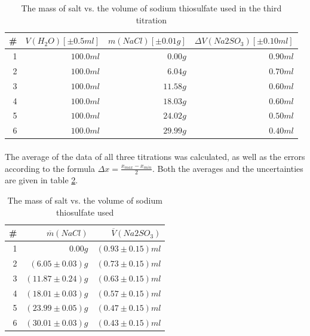 \documentclass[a4paper]{article}
\begin{document}
\begin{table}[ht]
  \center
  \begin{tabular}{ r | r | r | r }
    \# & $V(H_2O) \left[ \pm 0.5 \si{ml} \right]$ & $m(NaCl) \left[ \pm 0.01
      \si{g} \right]$ & $\Delta V(Na2SO_3) \left[ \pm 0.10 \si{ml} \right]$ \\
      \hline \hline
    1 & $100.0 \si{ml}$ & $0.00 \si{g}$ & $0.90 \si{ml}$ \\ \hline
    2 & $100.0 \si{ml}$ & $6.04 \si{g}$ & $0.70 \si{ml}$ \\ \hline
    3 & $100.0 \si{ml}$ & $11.58 \si{g}$ & $0.60 \si{ml}$ \\ \hline
    4 & $100.0 \si{ml}$ & $18.03 \si{g}$ & $0.60 \si{ml}$ \\ \hline
    5 & $100.0 \si{ml}$ & $24.02 \si{g}$ & $0.50 \si{ml}$ \\ \hline
    6 & $100.0 \si{ml}$ & $29.99 \si{g}$ & $0.40 \si{ml}$ \\ \hline
  \end{tabular}
  \caption{The mass of salt vs. the volume of sodium thiosulfate used in the
    third titration \label{tbl:calc-titration-3}}
\end{table}

\paragraph*{}
The average of the data of all three titrations was calculated, as well as the
errors according to the formula $\Delta x = \frac{x_{max} - x_{min}}{2}$. Both
the averages and the uncertainties are given in table
\ref{tbl:calc-titration-final}.
\begin{table}[ht]
  \center
  \begin{tabular}{ r | r | r }
    \# & $\overline{m}(NaCl)$ & $\overline{V}(Na2SO_3)$ \\ \hline \hline
    1 & $0.00 \si{g}$ & $(0.93 \pm 0.15) \si{ml}$ \\ \hline
    2 & $(6.05 \pm 0.03) \si{g}$ & $(0.73 \pm 0.15) \si{ml}$ \\ \hline
    3 & $(11.87 \pm 0.24) \si{g}$ & $(0.63 \pm 0.15) \si{ml}$ \\ \hline
    4 & $(18.01 \pm 0.03) \si{g}$ & $(0.57 \pm 0.15) \si{ml}$ \\ \hline
    5 & $(23.99 \pm 0.05) \si{g}$ & $(0.47 \pm 0.15) \si{ml}$ \\ \hline
    6 & $(30.01 \pm 0.03) \si{g}$ & $(0.43 \pm 0.15) \si{ml}$ \\ \hline
  \end{tabular}
  \caption{The mass of salt vs. the volume of sodium thiosulfate used
  \label{tbl:calc-titration-final}}
\end{table}
\end{document}

